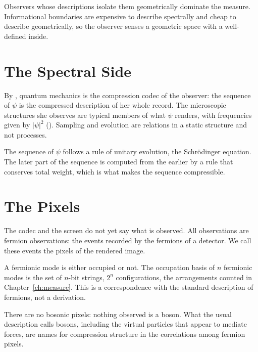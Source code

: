 \documentclass[11pt]{book}
\begin{document}
\begin{deduction}\label{ded:isolation}
  Observers whose descriptions isolate them geometrically dominate the
  measure. Informational boundaries are expensive to describe spectrally
  and cheap to describe geometrically, so the observer senses a geometric
  space with a well-defined inside.
\end{deduction}


\section{The Spectral Side}
\label{sec:spectral}

By , quantum mechanics is the compression codec of the
observer: the sequence of $\psi$ is the compressed description of her whole
record. The microscopic structures she observes are typical members of what
$\psi$ renders, with frequencies given by $|\psi|^2$ ().
Sampling and evolution are relations in a static structure and not
processes.

\begin{conjecture}\label{conj:evolution}
  The sequence of $\psi$ follows a rule of unitary evolution, the
  Schr\"odinger equation. The later part of the sequence is computed from
  the earlier by a rule that conserves total weight, which is what makes the
  sequence compressible.
\end{conjecture}


\section{The Pixels}
\label{sec:pixels}

The codec and the screen do not yet say what is observed. All observations
are fermion observations: the events recorded by the fermions of a
detector. We call these events the pixels of the rendered image.

A fermionic mode is either occupied or not. The
occupation basis of $n$ fermionic modes is the set of $n$-bit strings,
$2^n$ configurations, the arrangements counted in
Chapter~\ref{ch:measure}. This is a correspondence with the standard
description of fermions, not a derivation.

There are no bosonic pixels: nothing observed is a boson. What the usual
description calls bosons, including the virtual particles that appear to
mediate forces, are names for compression structure in the correlations
among fermion pixels.
\end{document}
